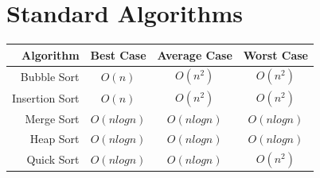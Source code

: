 \documentclass{article}
\begin{document}
\section{Standard Algorithms}

\begin{table}
    \centering

    \begin{tabular}{r|ccc}

    Algorithm & Best Case & Average Case & Worst Case\\
    \hline

    Bubble Sort & \(O(n)\) & \(O(n^2)\) & \(O(n^2)\)\\
    Insertion Sort & \(O(n)\) & \(O(n^2)\) & \(O(n^2)\)\\
    Merge Sort & \(O(nlogn)\) & \(O(nlogn)\) & \(O(nlogn)\)\\
    Heap Sort & \(O(nlogn)\) & \(O(nlogn)\) & \(O(nlogn)\)\\
    Quick Sort & \(O(nlogn)\) & \(O(nlogn)\) & \(O(n^2)\)\\


    \hline
    \end{tabular}

\end{table}
\end{document}
